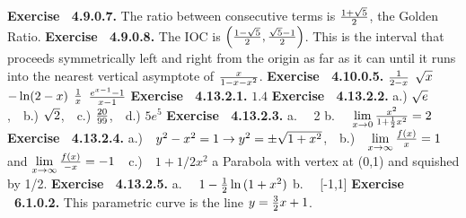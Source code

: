  {\noindent \protect \bf  Exercise ~4.9.0.7.} The ratio between consecutive terms is $\protect \frac  {1+\protect \sqrt  {5}}{2}$, the Golden Ratio. \protect \newline  \protect \newline  
 {\noindent \protect \bf  Exercise ~4.9.0.8.} The IOC is $\left (\protect \frac  {1-\protect \sqrt  {5}}{2},\protect \frac  {\protect \sqrt  {5}-1}{2}\right )$. This is the interval that proceeds symmetrically left and right from the origin as far as it can until it runs into the nearest vertical asymptote of $\protect \frac  {x}{1-x-x^2}$. \protect \newline  \protect \newline  
 {\noindent \protect \bf  Exercise ~4.10.0.5.} \textbullet $\protect \frac  {1}{2-x}$ \textbullet $\protect \sqrt  {x}$ \textbullet $-\protect \qopname  \relax o{ln}(2-x)$ \textbullet $\protect \frac  {1}{x} $ \textbullet $\protect \frac  {e^{x-1}-1}{x-1}$  \protect \newline  \protect \newline  
 {\noindent \protect \bf  Exercise ~4.13.2.1.} $1.4$ \protect \newline  \protect \newline  
 {\noindent \protect \bf  Exercise ~4.13.2.2.} a.) $\protect \sqrt  {e}$,~~b.) $\protect \sqrt  {2}$,~~c.) $\protect \frac  {20}{99}$,~~d.) $5e^5$ \protect \newline  \protect \newline  
 {\noindent \protect \bf  Exercise ~4.13.2.3.} a.~~ 2 b.~~ $\protect \qopname  \relax m{lim}\limits _{x\rightarrow 0} \protect \frac  {x^2}{1+\protect \frac  {1}{2}x^2} =2$  \protect \newline  \protect \newline  
 {\noindent \protect \bf  Exercise ~4.13.2.4.} a.)~~$y^2-x^2=1 \rightarrow y^2=\pm \protect \sqrt  {1+x^2}$,~~b.)~~$\protect \qopname  \relax m{lim}\limits _{x\rightarrow \infty } \protect \frac  {f(x)}{x}=1$ and $\protect \qopname  \relax m{lim}\limits _{x\rightarrow \infty } \protect \frac  {f(x)}{-x}=-1$~~c.)~~$1+1/2 x^2$ a Parabola with vertex at (0,1) and squished by 1/2. \protect \newline  \protect \newline  
 {\noindent \protect \bf  Exercise ~4.13.2.5.} a.~~ $1-\protect \frac  {1}{2} \protect \qopname  \relax o{ln}{(1+x^2)} $ b.~~ [-1,1]  \protect \newline  \protect \newline  
 {\noindent \protect \bf  Exercise ~6.1.0.2.} This parametric curve is the line $y=\protect \frac  {3}{2}x+1$. \protect \newline  \protect \newline  
